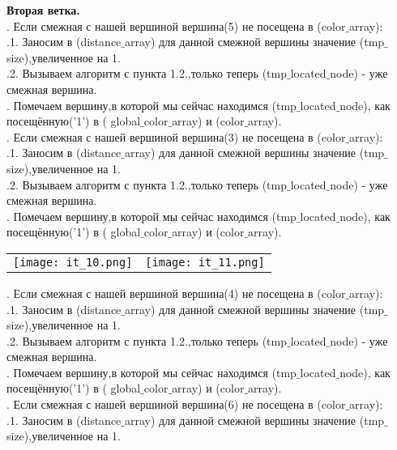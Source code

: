 \documentclass[a4paper,11pt]{article}
\begin{document}
\begin{flushleft}
\Large{\textbf{Вторая ветка.}} \\
. Если смежная с нашей вершиной вершина(5) не посещена в (color$\_$array): \\
\quad {}.1. Заносим в (distance$\_$array) для данной смежной вершины значение (tmp$\_$size),увеличенное на 1.\\
\quad {}.2. Вызываем алгоритм с пункта 1.2.,только теперь (tmp$\_$located$\_$node) - уже смежная вершина. \\
. Помечаем вершину,в которой мы сейчас находимся (tmp$\_$located$\_$node), как посещённую('1') в ( global$\_$color$\_$array) и (color$\_$array). \\
. Если смежная с нашей вершиной вершина(3) не посещена в (color$\_$array): \\
\quad {}.1. Заносим в (distance$\_$array) для данной смежной вершины значение (tmp$\_$size),увеличенное на 1.\\
\quad {}.2. Вызываем алгоритм с пункта 1.2.,только теперь (tmp$\_$located$\_$node) - уже смежная вершина. \\
. Помечаем вершину,в которой мы сейчас находимся (tmp$\_$located$\_$node), как посещённую('1') в ( global$\_$color$\_$array) и (color$\_$array). \\
\begin{tabulary}{\linewidth}{}
  \texttt{[image: it\_10.png]} 
  &
  \texttt{[image: it\_11.png]}
   \\                                                     
\end{tabulary}
. Если смежная с нашей вершиной вершина(4) не посещена в (color$\_$array): \\
\quad {}.1. Заносим в (distance$\_$array) для данной смежной вершины значение (tmp$\_$size),увеличенное на 1.\\
\quad {}.2. Вызываем алгоритм с пункта 1.2.,только теперь (tmp$\_$located$\_$node) - уже смежная вершина. \\
. Помечаем вершину,в которой мы сейчас находимся (tmp$\_$located$\_$node), как посещённую('1') в ( global$\_$color$\_$array) и (color$\_$array). \\
. Если смежная с нашей вершиной вершина(6) не посещена в (color$\_$array): \\
\quad {}.1. Заносим в (distance$\_$array) для данной смежной вершины значение (tmp$\_$size),увеличенное на 1.\\

\end{flushleft}
\end{document}
